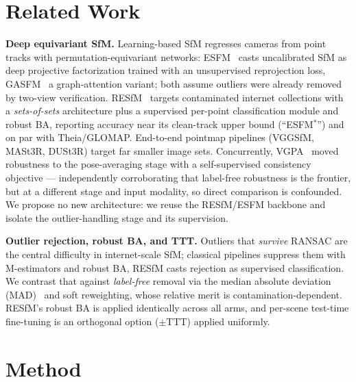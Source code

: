 \documentclass[10pt,twocolumn,letterpaper]{article}
\begin{document}
\section{Related Work}
\textbf{Deep equivariant SfM.} Learning-based SfM regresses cameras from point tracks
with permutation-equivariant networks: ESFM~\citep{esfm} casts uncalibrated SfM as deep
projective factorization trained with an unsupervised reprojection loss, GASFM~\citep{gasfm}
a graph-attention variant; both assume outliers were already removed by two-view
verification. RESfM~\citep{resfm} targets contaminated internet collections with a
\emph{sets-of-sets} architecture plus a supervised per-point classification module and
robust BA, reporting accuracy near its clean-track upper bound (``ESFM$^\ast$'') and on
par with Theia/GLOMAP. End-to-end pointmap pipelines (VGGSfM, MASt3R, DUSt3R) target far
smaller image sets. Concurrently, VGPA~\citep{vgpa} moved robustness to the pose-averaging
stage with a self-supervised consistency objective --- independently corroborating that
label-free robustness is the frontier, but at a different stage and input modality, so
direct comparison is confounded. We propose no new architecture: we reuse the RESfM/ESFM
backbone and isolate the outlier-handling stage and its supervision.

\noindent\textbf{Outlier rejection, robust BA, and TTT.} Outliers that \emph{survive}
RANSAC are the central difficulty in internet-scale SfM; classical pipelines suppress them
with M-estimators and robust BA, RESfM casts rejection as supervised classification. We
contrast that against \emph{label-free} removal via the median absolute deviation
(MAD)~\citep{mad} and soft reweighting, whose relative merit is contamination-dependent.
RESfM's robust BA is applied identically across all arms, and per-scene test-time
fine-tuning is an orthogonal option ($\pm$TTT) applied uniformly.

\section{Method}
\end{document}
